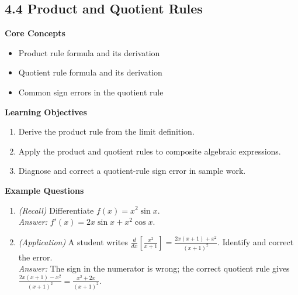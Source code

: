 \documentclass[11pt]{article}
\begin{document}
\subsection{4.4 Product and Quotient Rules}
\textbf{Core Concepts}
\begin{itemize}
\item Product rule formula and its derivation
\item Quotient rule formula and its derivation
\item Common sign errors in the quotient rule
\end{itemize}
\textbf{Learning Objectives}
\begin{enumerate}
\item Derive the product rule from the limit definition.
\item Apply the product and quotient rules to composite algebraic expressions.
\item Diagnose and correct a quotient-rule sign error in sample work.
\end{enumerate}
\textbf{Example Questions}
\begin{enumerate}
\item \emph{(Recall)} Differentiate $f(x) = x^2\sin x$. \\
\textit{Answer:} $f'(x) = 2x\sin x + x^2\cos x$.
\item \emph{(Application)} A student writes $\frac{d}{dx}\left[\frac{x^2}{x+1}\right] = \frac{2x(x+1)+x^2}{(x+1)^2}$. Identify and correct the error. \\
\textit{Answer:} The sign in the numerator is wrong; the correct quotient rule gives $\frac{2x(x+1)-x^2}{(x+1)^2} = \frac{x^2+2x}{(x+1)^2}$.
\end{enumerate}
\end{document}
